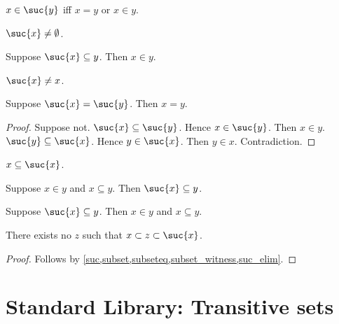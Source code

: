 \begin{proposition}\label{suc_iff}
    $x\in\suc{y}$ iff $x = y$ or $x\in y$.
\end{proposition}

\begin{proposition}\label{suc_neq_emptyset}
    $\suc{x}\neq \emptyset$.
\end{proposition}

\begin{proposition}\label{suc_subseteq_implies_in}
    Suppose $\suc{x}\subseteq y$. Then $x\in y$.
\end{proposition}

\begin{proposition}\label{suc_neq_self}
    $\suc{x}\neq x$.
\end{proposition}

\begin{proposition}\label{suc_injective}
    Suppose $\suc{x} = \suc{y}$. Then $x = y$.
\end{proposition}
\begin{proof}
    Suppose not.
    $\suc{x}\subseteq \suc{y}$. Hence $x\in\suc{y}$.
    Then $x\in y$.
    $\suc{y}\subseteq \suc{x}$. Hence $y\in\suc{x}$.
    Then $y\in x$.
    Contradiction.
\end{proof}

\begin{proposition}\label{subseteq_self_suc_intro}
    $x\subseteq\suc{x}$.
\end{proposition}

\begin{proposition}\label{suc_subseteq_intro}
    Suppose $x\in y$ and $x\subseteq y$.
    Then $\suc{x}\subseteq y$.
\end{proposition}

\begin{proposition}\label{suc_subseteq_elim}
    Suppose $\suc{x}\subseteq y$.
    Then $x\in y$ and $x\subseteq y$.
\end{proposition}

\begin{proposition}\label{suc_next_subset}
    There exists no $z$ such that $x\subset z\subset \suc{x}$.
\end{proposition}
\begin{proof}
    Follows by \cref{suc,subset,subseteq,subset_witness,suc_elim}.
\end{proof}

\section{Standard Library: Transitive sets}

